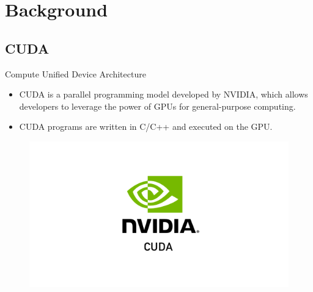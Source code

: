 \section{Background}
\subsection{CUDA}

\begin{frame}
    \begin{block}{Compute Unified Device Architecture}
        \begin{itemize}
            \item CUDA is a parallel programming model developed by NVIDIA, which allows developers 
            to leverage the power of GPUs for general-purpose computing.
            \item CUDA programs are written in C/C++ and executed on the GPU.
        \end{itemize}
        \begin{center}
            \begin{figure}[H]
                \includegraphics[scale=0.5]{figures/Cuda.png}
            \end{figure}
        \end{center}        
    \end{block}
\end{frame}

